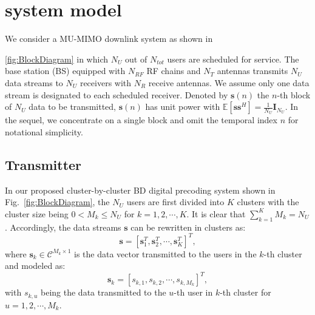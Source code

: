\documentclass[conference]{IEEEtran}
\begin{document}
\section{system model}
We consider a MU-MIMO downlink system as shown in \figurename{\ref{fig:BlockDiagram} in which $N_U$ out of $N_{tot}$ users are scheduled for service. The base station (BS) equipped with $N_{RF}$ RF chains and $N_T$ antennas transmits $N_U$ data streams to $N_U$ receivers with $N_R$ receive antennas. We assume only one data stream is designated to each scheduled receiver. Denoted by ${\bm s}(n)$ the $n$-th block of $N_U$ data to be transmitted, ${\bm s}(n)$ has unit power with $\mathbb{E}\left[\bm{ss}^H\right]=\frac{1}{N_U}\bm{I}_{N_U}$. In the sequel, we concentrate on a single block and omit the temporal index $n$ for notational simplicity.

\subsection{Transmitter}
In our proposed cluster-by-cluster BD digital precoding system shown in Fig.~\ref{fig:BlockDiagram}, the $N_U$ users are first divided into $K$ clusters with the cluster size being $0< M_k\leq N_U$ for $k=1,2,\cdots,K$. It is clear that $\displaystyle\sum_{k=1}^{K} M_k = N_U$. Accordingly, the data streams $\bm{s}$ can be rewritten in clusters as:
\begin{equation}
\bm{s} = \left[{\mathbf{s}}_1^T, {\mathbf{s}}_2^T,\cdots, \mathbf{s}_{K}^T\right]^T,
\end{equation}
where $\mathbf{s}_k\in \mathcal{C}^{M_k\times 1}$ is the data vector transmitted to the users in the $k$-th cluster and modeled as:
\begin{equation}
\mathbf{s}_k = \left[s_{k,1}, s_{k,2},\cdots, s_{k,M_k}\right]^T,
\end{equation}
with $s_{k,u}$ being the data transmitted to the $u$-th user in $k$-th cluster for $u=1,2,\cdots,M_k$.

}
\end{document}
